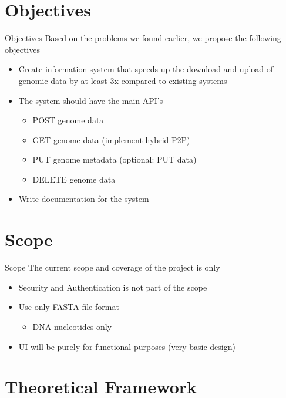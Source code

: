 \documentclass{beamer}
\begin{document}
\section{Objectives}
\begin{frame}{Objectives}
Based on the problems we found earlier, we propose the following objectives
    \begin{itemize}
        \item Create information system that speeds up the download and upload of genomic data by at least 3x compared to existing systems
        \item The system should have the main API's
        \begin{itemize}
            \item POST genome data
            \item GET genome data (implement hybrid P2P)
            \item PUT genome metadata (optional: PUT data)
            \item DELETE genome data
        \end{itemize}
        \item Write documentation for the system
    \end{itemize}
\end{frame}

\section{Scope}
\begin{frame}{Scope}
The current scope and coverage of the project is only
\begin{itemize}
    \item Security and Authentication is not part of the scope
    \item Use only FASTA file format 
    \begin{itemize}
        \item DNA nucleotides only
    \end{itemize}
    \item UI will be purely for functional purposes (very basic design)
\end{itemize}
\end{frame}

\section{Theoretical Framework}
\end{document}
